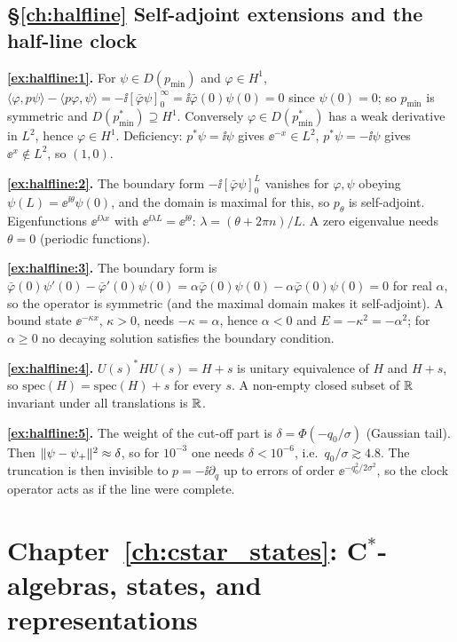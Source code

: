 {\subsection*{\S\ref{ch:halfline} Self-adjoint extensions and the half-line clock}
\textbf{\ref{ex:halfline:1}.} For $\psi\in D(p_{\min})$ and $\varphi\in H^1$, $\langle\varphi,p\psi\rangle-\langle p\varphi,\psi\rangle=-\ii[\bar\varphi\psi]_0^\infty=\ii\bar\varphi(0)\psi(0)=0$ since $\psi(0)=0$; so $p_{\min}$ is symmetric and $D(p_{\min}^*)\supseteq H^1$. Conversely $\varphi\in D(p^*_{\min})$ has a weak derivative in $L^2$, hence $\varphi\in H^1$. Deficiency: $p^*\psi=\ii\psi$ gives $\ee^{-x}\in L^2$, $p^*\psi=-\ii\psi$ gives $\ee^{x}\notin L^2$, so $(1,0)$.\par
\textbf{\ref{ex:halfline:2}.} The boundary form $-\ii[\bar\varphi\psi]_0^L$ vanishes for $\varphi,\psi$ obeying $\psi(L)=\ee^{\ii\theta}\psi(0)$, and the domain is maximal for this, so $p_\theta$ is self-adjoint. Eigenfunctions $\ee^{\ii\lambda x}$ with $\ee^{\ii\lambda L}=\ee^{\ii\theta}$: $\lambda=(\theta+2\pi n)/L$. A zero eigenvalue needs $\theta=0$ (periodic functions).\par
\textbf{\ref{ex:halfline:3}.} The boundary form is $\bar\varphi(0)\psi'(0)-\bar\varphi'(0)\psi(0)=\alpha\bar\varphi(0)\psi(0)-\alpha\bar\varphi(0)\psi(0)=0$ for real $\alpha$, so the operator is symmetric (and the maximal domain makes it self-adjoint). A bound state $\ee^{-\kappa x}$, $\kappa>0$, needs $-\kappa=\alpha$, hence $\alpha<0$ and $E=-\kappa^2=-\alpha^2$; for $\alpha\ge0$ no decaying solution satisfies the boundary condition.\par
\textbf{\ref{ex:halfline:4}.} $U(s)^*HU(s)=H+s$ is unitary equivalence of $H$ and $H+s$, so $\mathrm{spec}(H)=\mathrm{spec}(H)+s$ for every $s$. A non-empty closed subset of $\mathbb{R}$ invariant under all translations is $\mathbb{R}$.\par
\textbf{\ref{ex:halfline:5}.} The weight of the cut-off part is $\delta=\Phi(-q_0/\sigma)$ (Gaussian tail). Then $\lVert \psi-\psi_+\rVert^2\approx\delta$, so for $10^{-3}$ one needs $\delta<10^{-6}$, i.e.\ $q_0/\sigma\gtrsim4.8$. The truncation is then invisible to $p=-\ii\partial_q$ up to errors of order $\ee^{-q_0^2/2\sigma^2}$, so the clock operator acts as if the line were complete.\par

\section*{Chapter~\ref{ch:cstar_states}: C$^*$-algebras, states, and representations}

}
